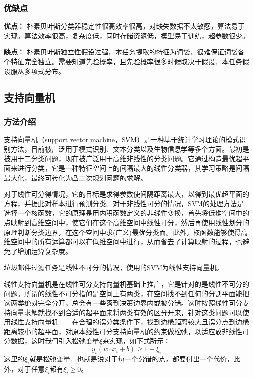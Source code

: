 \documentclass[a4paper]{article}
\begin{document}
\subsubsection{优缺点}
\textbf{优点：}
朴素贝叶斯分类器稳定性很高效率很高，对缺失数据不太敏感，算法易于实现。算法效率很高，复杂度低，同时存储资源低，模型易于训练，超参数很少。

\textbf{缺点：}
朴素贝叶斯独立性假设过强，本任务提取的特征为词袋，很难保证词袋各个特征完全独立。需要知道先验概率，且先验概率很多时候取决于假设，本任务假设服从多项式分布。

\subsection{支持向量机}
\subsubsection{方法介绍}
支持向量机（support vector machine，SVM）是一种基于统计学习理论的模式识别方法，目前被广泛用于模式识别、文本分类以及生物信息学等多个方面。最初是被用于二分类问题，现在被广泛用于高维非线性的分类问题。它通过构造最优超平面来进行分类，它是一种特征空间上的间隔最大的线性分类器，其学习策略是间隔最大化，最终可转化为凸二次规划问题的求解。

对于线性可分得情况，它的目标是求得参数使间隔距离最大，以得到最优超平面的方程，并据此对样本进行预测分类。对于非线性可分的情况，SVM的处理方法是选择一个核函数，它的原理是用内积函数定义的非线性变换，首先将低维空间中的点映射到高维空间中，使它们在这个高维空间中线性可分，然后再使用线性划分的原理判断分类边界，在这个空间中求(广义)最优分类面。此外，核函数能够使得高维空间中的所有运算都可以在低维空间中进行，从而省去了计算映射的过程，也避免了增加运算复杂度。

垃圾邮件过滤任务是线性不可分的情况，使用的SVM为线性支持向量机。

线性支持向量机是在线性可分支持向量机基础上推广，它是针对的是线性不可分的问题。所谓的线性不可分指的是空间上有两类，在空间找不到任何的分割平面能把这两类绝对完全分开，总会有一些落到决策边界内或被分错。这时按照线性可分支持向量求解就找不到合适的超平面来将两类有效的区分开来，针对这类问题可以使用线性支持向量机——在合理的误分类条件下，找到边缘距离较大且误分点到边缘距离较小的超平面，对原本线性可分支持向量机的约束做松弛，以适应放非线性可分数据，这时我们引入松弛变量$\xi$来实现，如下式所示：
\begin{equation}\label{equ:PixelColorContrast}
   y_{i}(w \cdot x_{i} + b) \geq 1-\xi_{i}
\end{equation}
这里的$\xi_{i}$就是松弛变量，也就是说对于每一个分错的点，都要付出一个代价，此外，对于任意$\xi_{i}$都有$\xi_{i} \geq 0$。
\end{document}
